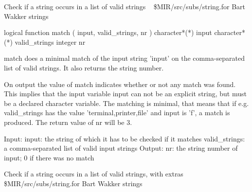 %
\noindent Check if a string occurs in a list of valid strings
\newline \ 
\newline {} \$MIR/src/subs/string.for
\newline {} Bart Wakker
\newline {} strings
\par{\tenpoint
{\eightpoint\begintt
      logical function match ( input, valid_strings, nr )
      character*(*) input
      character*(*) valid_strings
      integer       nr

 match does a minimal match of the input string 'input' on the comma-separated
 list of valid strings. It also returns the string number.

 On output the value of match indicates whether or not any match was found.
 This implies that the input variable input can not be an explicit string,
 but must be a declared character variable.
 The matching is minimal, that means that if e.g. valid_strings has the value
 'terminal,printer,file' and input is 'f', a match is produced. The return
 value of nr will be 3.
 
 Input:
   input:         the string of which it has to be checked if it matches
   valid_strings: a comma-separated list of valid input strings
 Output:
   nr:            the string number of input; 0 if there was no match
\endtt}
\par}
%
\noindent Check if a string occurs in a list of valid strings, with extras
\newline \ 
\newline \abox{File:} \$MIR/src/subs/string.for
\newline {} Bart Wakker
\newline \abox{Keywords:} strings
